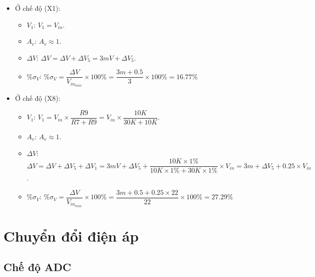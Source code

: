 \begin{itemize}[label = -]
	\item Ở chế độ (X1):
		\begin{itemize}[label = +]
			\item $V_1$: $V_{1} = V_{in}$.
			\item $A_{v}$: $A_{v} \approx 1$.
			\item $\Delta V$: $\Delta V = \Delta V + \Delta V_{5} = 3mV + \Delta V_{5}$.
			\item $\%\sigma_{V}$: $\%\sigma_{V} = \dfrac{\Delta V}{V_{in_{max}}} \times 100\% = \dfrac{3m + 0.5}{3} \times 100\% = 16.77\%$
		\end{itemize}
	\item Ở chế độ (X8):
		\begin{itemize}[label = +]
			\item $V_1$: $V_{1} = V_{in} \times \dfrac{R9}{R7 + R9} = V_{in}\times \dfrac{10K}{30K + 10K}$.
			\item $A_{v}$: $A_{v} \approx 1$.
			\item $\Delta V$: $\Delta V = \Delta V + \Delta V_{5} + \Delta V_{1}= 3mV + \Delta V_{5} + \dfrac{10K \times 1\%}{10K\times 1\% + 30K\times 1\%}\times V_{in} = 3m + \Delta V_{5} + 0.25\times V_{in}$.
			\item $\%\sigma_{V}$: $\%\sigma_{V} = \dfrac{\Delta V}{V_{in_{max}}} \times 100\% = \dfrac{3m + 0.5 + 0.25\times22}{22} \times 100\% = 27.29\%$
		\end{itemize}
\end{itemize}

\section{Chuyển đổi điện áp}
\subsection{Chế độ ADC}

